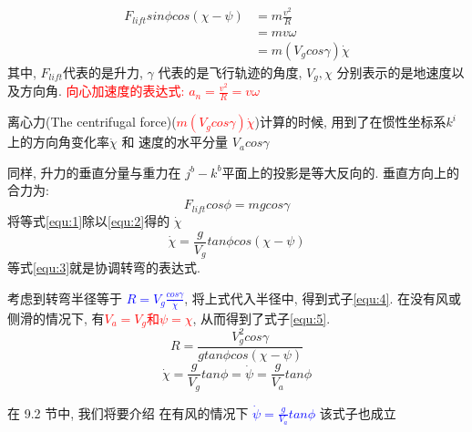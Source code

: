     \begin{align}
        F_{lift} sin \phi cos (\chi - \psi) &= m \frac{v^{2}}{R} \nonumber \\
        &= m v \omega \nonumber \\
        &= m (V_{g} cos \gamma) \dot{\chi} 
        \label{equ:1}
    \end{align}
    其中, $F_{lift}$代表的是升力, $\gamma$ 代表的是飞行轨迹的角度, $V_{g}, \chi$ 分别表示的是地速度以及方向角. \textcolor{red}{向心加速度的表达式: $a_{n} = \frac{v^{2}}{R} = v \omega$}
    \par 离心力(The centrifugal force)(\textcolor{red}{$m (V_{g} cos \gamma) \dot{\chi} $})计算的时候, 用到了在惯性坐标系$k^{i}$上的方向角变化率$\dot{\chi}$ 和 速度的水平分量 $V_{a}cos \gamma$
    \par 同样, 升力的垂直分量与重力在 $j^{b} - k^{b}$平面上的投影是等大反向的. 
    垂直方向上的合力为:
    \begin{equation}
        F_{lift} cos \phi = mg cos\gamma
        \label{equ:2}
    \end{equation}
    将等式\ref{equ:1}除以\ref{equ:2}得的 $\dot{\chi}$
    \begin{equation}
        \dot{\chi} = \frac{g}{V_{g}} tan \phi cos(\chi - \psi)
        \label{equ:3}
    \end{equation}
    等式\ref{equ:3}就是协调转弯的表达式. 
    \par 考虑到转弯半径等于 \textcolor{blue}{ $R = V_{g} \frac{cos \gamma}{\dot{\chi}}$}, 将上式代入半径中, 得到式子\ref{equ:4}. 在没有风或侧滑的情况下, 有\textcolor{red}{$V_{a} = V_{g}$和$\psi = \chi$}, 从而得到了式子\ref{equ:5}. 
    \begin{equation}
        R = \frac{V_{g}^{2} cos \gamma}{g tan \phi cos(\chi - \psi)} 
        \label{equ:4}
    \end{equation}
    \begin{equation}
        \dot{\chi} = \frac{g}{V_{g}} tan \phi = \dot{\psi} = \frac{g}{V_{a}} tan \phi
        \label{equ:5}
    \end{equation}
    \par 在 9.2 节中, 我们将要介绍 在有风的情况下 \textcolor{blue}{$ \dot{\psi} = \frac{g}{V_{a}} tan \phi$} 该式子也成立
    \clearpage
